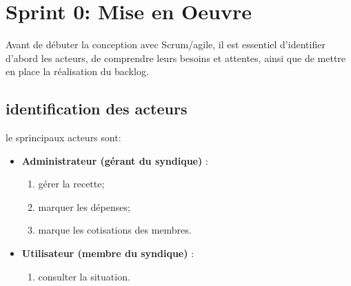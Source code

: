 \section{Sprint 0: Mise en Oeuvre}
Avant de débuter la conception avec Scrum/agile, il est essentiel d'identifier d'abord les acteurs, de comprendre leurs besoins et attentes, ainsi que de mettre en place la réalisation du backlog.
\subsection{identification des acteurs}
le sprincipaux acteurs sont: 
\begin{itemize}
    \item \textbf{Administrateur (gérant du syndique)} : 
    \begin{enumerate}
        \item gérer la recette;
        \item marquer les dépenses;
        \item marque les cotisations des membres.
    \end{enumerate} 
    \item \textbf{Utilisateur (membre du syndique)} : 
    \begin{enumerate}
        \item consulter la situation.
    \end{enumerate}
\end{itemize}
